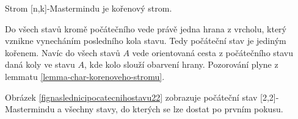 \begin{pozorovani}
    Strom [n,k]-Mastermindu je kořenový strom.
\end{pozorovani}
\begin{dukaz}
    Do všech stavů kromě počátečního vede právě jedna hrana z vrcholu, který vznikne vynecháním posledního kola stavu. Tedy počáteční stav je jediným kořenem. Navíc do všech stavů $A$ vede orientovaná cesta z počátečního stavu daná koly ve stavu $A$, kde kolo slouží obarvení hrany. Pozorování plyne z lemmatu \ref{lemma-char-korenoveho-stromu}.


    
\end{dukaz}

Obrázek \ref{fignaslednicipocatecnihostavu22} zobrazuje počáteční stav [2,2]-Mastermindu a všechny stavy, do kterých se lze dostat po prvním pokusu. 


